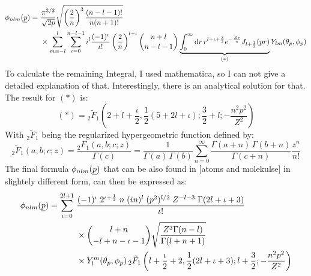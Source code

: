 \begin{align*}
    \phi_{nlm}(\underline{p}) =\ & \frac{\pi^{3/2}}{\sqrt{2p}}\sqrt{\left(\frac{2}{n}\right)^3\frac{(n-l-1)!}{n(n+1)!}}\\
    & \times \sum_{m=-l}^{l}\sum_{\iota=0}^{n-l-1}i^l\frac{(-1)^{\iota}}{\iota!}\left(\frac{2}{n}\right)^{l+\iota}\binom{n+l}{n-l-1}\underbrace{\int_{0}^{\infty}\mathrm{d} r\,r^{l+\iota+\frac{3}{2}}e^{-\frac{Zr}{n}}J_{l+\frac{1}{2}}(pr)}_{(*)} Y_{lm}(\theta_p,\phi_p)
\end{align*}
To calculate the remaining Integral, I used mathematica, so I can not give a detailed explanation of that. Interestingly, there is an analytical solution for that. 
The result for $(*)$ is:
\begin{equation*}
    (*) = {}_2\tilde{F}_1\left(2 + l + \frac{\iota}{2}, \frac{1}{2}(5 + 2l + \iota); \frac{3}{2} + l; -\frac{n^2 p^2}{Z^2}\right)
\end{equation*}
With ${}_2\tilde{F}_1$ being the regularized hypergeometric function defined by:
\begin{equation*}
    {}_2\tilde{F}_1(a,b;c;z) = \frac{{}_2F_1(a,b;c;z)}{\Gamma(c)} = \frac{1}{\Gamma(a)\,\Gamma(b)} \sum_{n=0}^{\infty} \frac{\Gamma(a+n)\,\Gamma(b+n)}{\Gamma(c+n)} \frac{z^n}{n!}
\end{equation*}
The final formula $\phi_{nlm}(\underline{p})$ that can be also found in [atoms and molekulse] in slightely different form, can then be expressed as:
\begin{align}
    \label{eq:phi_nlm}
    \phi_{nlm}(\underline{p}) = \sum_{\iota=0}^{2l+1} \;
        & \frac{(-1)^{\iota} \; 2^{\iota + \frac{1}{2}} \; n \; (i n)^l \; (p^2)^{l/2} \; Z^{-l-3} \; \Gamma(2l+\iota+3)}{\iota!} \nonumber \\
        & \times \binom{l+n}{-l+n-\iota-1} 
        \sqrt{\frac{Z^3 \Gamma(n-l)}{\Gamma(l+n+1)}} \nonumber \\
        & \times Y_l^m(\theta_p, \phi_p) \,
        {}_2\tilde{F}_1\left(l+\frac{\iota}{2}+2, \frac{1}{2}(2l+\iota+3); l+\frac{3}{2}; -\frac{n^2 p^2}{Z^2}\right)
\end{align}



